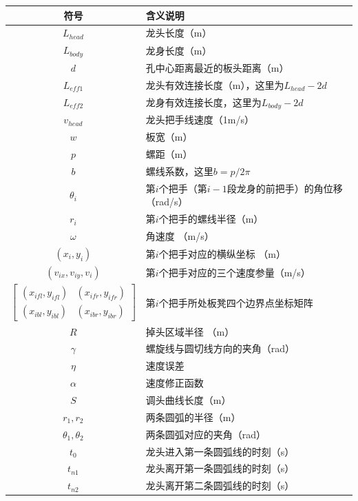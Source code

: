 \documentclass{cumcmthesis1}
\begin{document}
\begin{table}[h!]
    \centering
    \begin{tabularx}{\textwidth}{c|X}
    \toprule
    \textbf{符号} & \textbf{含义说明} \\
    \midrule
    $L_{head}$ & 龙头长度（m） \\
    $L_{body}$ & 龙身长度（m） \\
    $d$ & 孔中心距离最近的板头距离（m） \\
    $L_{eff1}$ & 龙头有效连接长度（m），这里为$L_{head}-2d$ \\
    $L_{eff2}$ & 龙身有效连接长度，这里为$L_{body}-2d$ \\
    $v_{head}$ &  龙头把手线速度（1m/s）\\
    $w$ & 板宽（m） \\
    $p$ & 螺距（m） \\
    $b$ & 螺线系数，这里$b=p/2 \pi$ \\
    $\theta_i$ & 第$i$个把手（第$i-1$段龙身的前把手）的角位移（rad/s）\\
    $r_i$ & 第$i$个把手的螺线半径（m） \\
    $\omega$ &角速度 （m/s）\\
    $(x_i, y_i)$ & 第$i$个把手对应的横纵坐标 （m）\\
    $(v_{ix}, v_{iy}, v_{i})$ & 第$i$个把手对应的三个速度参量（m/s） \\
    $ \begin{bmatrix}
    (x_{ifl}, y_{ifl}) & (x_{ifr}, y_{ifr}) \\
    (x_{ibl}, y_{ibl}) & (x_{ibr}, y_{ibr})
    \end{bmatrix} $ & 第$i$个把手所处板凳四个边界点坐标矩阵 \\
    $R $ & 掉头区域半径 （m）\\
    $\gamma$ & 螺旋线与圆切线方向的夹角（rad）\\
    $\eta$ & 速度误差\\
    $\alpha$ & 速度修正函数\\
    $S $ & 调头曲线长度（m）\\
    $r_1, r_2$ &  两条圆弧的半径（m）\\
    $\theta_1 , \theta_2$ & 两条圆弧对应的夹角（rad）\\
    $t_0$ & 龙头进入第一条圆弧线的时刻（s）\\
    $t_{n1}$ & 龙头离开第一条圆弧线的时刻（s）\\
    $t_{n2}$ & 龙头离开第二条圆弧线的时刻（s）\\
    \bottomrule
    \end{tabularx}
\end{table}
\end{document}
